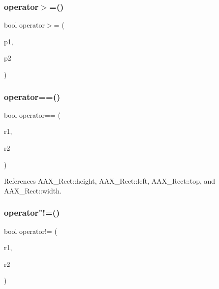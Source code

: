 \mbox{\label{a00503_aab8ccb30f5a16c24a5364804fb28478c}} 
\subsubsection{\texorpdfstring{operator$>$=()}{operator>=()}}
{\footnotesize\ttfamily bool operator$>$= (\begin{DoxyParamCaption}\item[{const \mbox{\hyperlink{a01609}{A\+A\+X\+\_\+\+Point}} \&}]{p1,  }\item[{const \mbox{\hyperlink{a01609}{A\+A\+X\+\_\+\+Point}} \&}]{p2 }\end{DoxyParamCaption})\hspace{0.3cm}{\ttfamily [inline]}}

\mbox{\label{a00503_a94c3ae4ba9ec60e0ccb85c6b565908db}} 
\subsubsection{\texorpdfstring{operator==()}{operator==()}\hspace{0.1cm}{\footnotesize\ttfamily [2/2]}}
{\footnotesize\ttfamily bool operator== (\begin{DoxyParamCaption}\item[{const \mbox{\hyperlink{a01613}{A\+A\+X\+\_\+\+Rect}} \&}]{r1,  }\item[{const \mbox{\hyperlink{a01613}{A\+A\+X\+\_\+\+Rect}} \&}]{r2 }\end{DoxyParamCaption})\hspace{0.3cm}{\ttfamily [inline]}}



References A\+A\+X\+\_\+\+Rect\+::height, A\+A\+X\+\_\+\+Rect\+::left, A\+A\+X\+\_\+\+Rect\+::top, and A\+A\+X\+\_\+\+Rect\+::width.

\mbox{\label{a00503_af834f4e14c1f9e811efa1921a520fdcb}} 
\subsubsection{\texorpdfstring{operator"!=()}{operator!=()}\hspace{0.1cm}{\footnotesize\ttfamily [2/2]}}
{\footnotesize\ttfamily bool operator!= (\begin{DoxyParamCaption}\item[{const \mbox{\hyperlink{a01613}{A\+A\+X\+\_\+\+Rect}} \&}]{r1,  }\item[{const \mbox{\hyperlink{a01613}{A\+A\+X\+\_\+\+Rect}} \&}]{r2 }\end{DoxyParamCaption})\hspace{0.3cm}{\ttfamily [inline]}}

